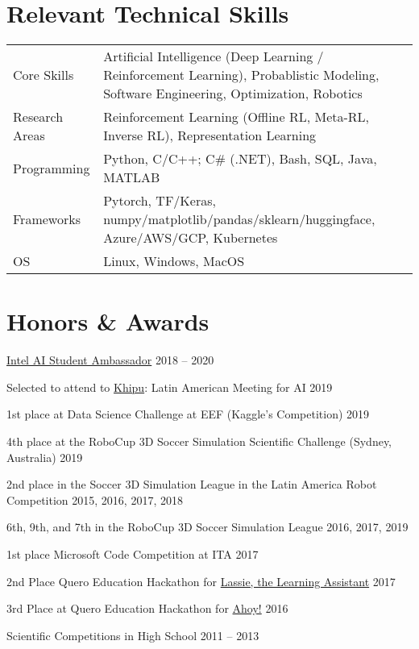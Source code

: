 \documentclass[11pt,letter,sans,colorlinks,linkcolor=true]{moderncv}
\begin{document}
\section{Relevant Technical Skills}
\begin{tabular}{p{1in}p{5in}}
    Core Skills & Artificial Intelligence (Deep Learning / Reinforcement Learning), Probablistic Modeling, Software Engineering, Optimization, Robotics
 \\
    Research Areas & Reinforcement Learning (Offline RL, Meta-RL, Inverse RL), Representation Learning
 \\
    Programming & Python, C/C++; C\# (.NET), Bash, SQL, Java, MATLAB
 \\
    Frameworks & Pytorch, TF/Keras, numpy/matplotlib/pandas/sklearn/huggingface, Azure/AWS/GCP, Kubernetes
 \\
    OS & Linux, Windows, MacOS
 \\
\end{tabular}


\section{Honors \& Awards}
  \href{https://software.intel.com/en-us/ai-academy/ambassadors}{Intel AI Student Ambassador} \hfill 2018 -- 2020
    \par
  Selected to attend to \href{https://khipu.ai/}{Khipu}: Latin American Meeting for AI \hfill 2019
    \par
  1st place at Data Science Challenge at EEF (Kaggle's Competition) \hfill 2019
    \par
  4th place at the RoboCup 3D Soccer Simulation Scientific Challenge (Sydney, Australia) \hfill 2019
    \par
  2nd place in the Soccer 3D Simulation League in the Latin America Robot Competition \hfill 2015, 2016, 2017, 2018
    \par
  6th, 9th, and 7th in the RoboCup 3D Soccer Simulation League \hfill 2016, 2017, 2019
    \par
  1st place Microsoft Code Competition at ITA \hfill 2017
    \par
  2nd Place Quero Education Hackathon for \href{https://github.com/mknarciso/lassie}{Lassie, the Learning Assistant} \hfill 2017
    \par
  3rd Place at Quero Education Hackathon for \href{https://github.com/AcademiaBarbaNegra}{Ahoy!} \hfill 2016
    \par
  Scientific Competitions in High School \hfill 2011 -- 2013
    \\ {\scriptsize \color{gray}{Physics (5 medals), Chemistry (8 medals), Astronomy (2 medals)
} \par}
\end{document}
